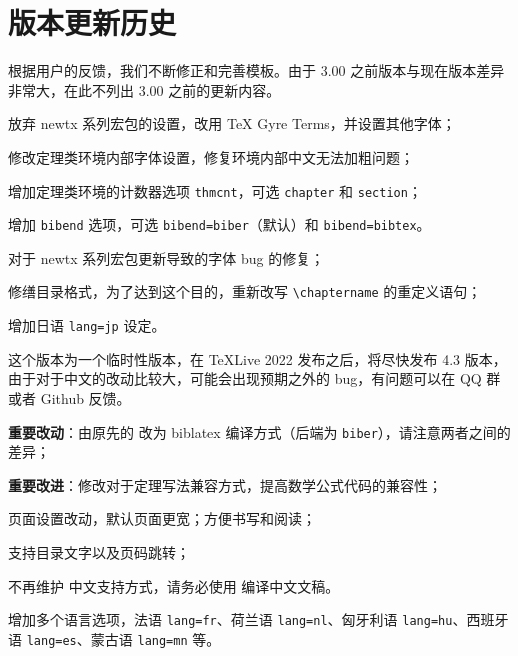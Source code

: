 \documentclass[lang=cn,10pt,cite=super]{elegantbook}
\begin{document}
\chapter{版本更新历史}

根据用户的反馈，我们不断修正和完善模板。由于 3.00 之前版本与现在版本差异非常大，在此不列出 3.00 之前的更新内容。



\begin{change}
  \item 放弃 newtx 系列宏包的设置，改用 TeX Gyre Terms，并设置其他字体；
  \item 修改定理类环境内部字体设置，修复环境内部中文无法加粗问题；
  \item 增加定理类环境的计数器选项 \lstinline{thmcnt}，可选 \lstinline{chapter} 和 \lstinline{section}；
  \item 增加 \lstinline{bibend} 选项，可选 \lstinline{bibend=biber}（默认）和 \lstinline{bibend=bibtex}。
\end{change}




\begin{change}
  \item 对于 newtx 系列宏包更新导致的字体 bug 的修复；
  \item 修缮目录格式，为了达到这个目的，重新改写 \lstinline{\chaptername} 的重定义语句；
  \item 增加日语 \lstinline{lang=jp} 设定。
  \item 这个版本为一个临时性版本，在 \TeX Live 2022 发布之后，将尽快发布 4.3 版本，由于对于中文的改动比较大，可能会出现预期之外的 bug，有问题可以在 QQ 群或者 Github 反馈。
\end{change}



\begin{change}
  \item \textbf{重要改动}：由原先的  改为 biblatex 编译方式（后端为 \lstinline{biber}），请注意两者之间的差异；
  \item \textbf{重要改进}：修改对于定理写法兼容方式，提高数学公式代码的兼容性；
  \item 页面设置改动，默认页面更宽；方便书写和阅读；
  \item 支持目录文字以及页码跳转；
  \item 不再维护  中文支持方式，请务必使用  编译中文文稿。
  \item 增加多个语言选项，法语 \lstinline{lang=fr}、荷兰语 \lstinline{lang=nl}、匈牙利语 \lstinline{lang=hu}、西班牙语 \lstinline{lang=es}、蒙古语 \lstinline{lang=mn} 等。
\end{change}
\end{document}

